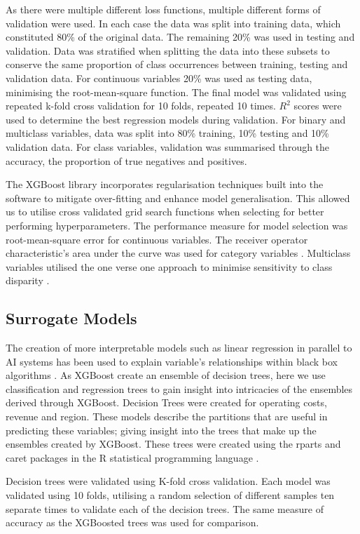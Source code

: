 \documentclass[review,12pt,authoryear]{elsarticle}
\begin{document}
\begin{linenumbers}
As there were multiple different loss functions, multiple different forms of validation were used. In each case the data was split into training data, which constituted 80\% of the original data. The remaining 20\% was used in testing and validation. Data was stratified when splitting the data into these subsets to conserve the same proportion of class occurrences between training, testing and validation data. For continuous variables 20\% was used as testing data, minimising the root-mean-square function. The final model was validated using repeated k-fold cross validation for 10 folds, repeated 10 times. $R^2$ scores were used to determine the best regression models during validation.
For binary and multiclass variables, data was split into 80\% training, 10\% testing and 10\% validation data. For class variables, validation was summarised through the accuracy, the proportion of true negatives and positives.
\par
The XGBoost library incorporates regularisation techniques built into the software to mitigate over-fitting and enhance model generalisation. This allowed us to utilise cross validated grid search functions when selecting for better performing hyperparameters. The performance measure for model selection was root-mean-square error for continuous variables. The receiver operator characteristic's area under the curve was used for category variables \citep{hanley1982meaning}. Multiclass variables utilised the one verse one approach to minimise sensitivity to class disparity \citep{ferriExperimentalComparisonPerformance2009,handSimpleGeneralisationArea2001}.

\subsection{Surrogate Models}

The creation of more interpretable models such as linear regression in parallel to AI systems has been used to explain variable's relationships within black box algorithms \citep{molnarInterpretableMachineLearning2022}. As XGBoost create an ensemble of decision trees, here we use classification and regression trees to gain insight into intricacies of the ensembles derived through XGBoost. Decision Trees were created for operating costs, revenue and region. These models describe the partitions that are useful in predicting these variables; giving insight into the trees that make up the ensembles created by XGBoost. These trees were created using the rparts and caret packages \citep{kuhnBuildingPredictiveModels2008,terrytherneauRpartRecursivePartitioning2022} in the R statistical programming language \citep{rcoreteamLanguageEnvironmentStatistical2021}.
\par
Decision trees were validated using K-fold cross validation. Each model was validated using 10 folds, utilising a random selection of different samples ten separate times to validate each of the decision trees. The same measure of accuracy as the XGBoosted trees was used for comparison.


\end{linenumbers}
\end{document}

